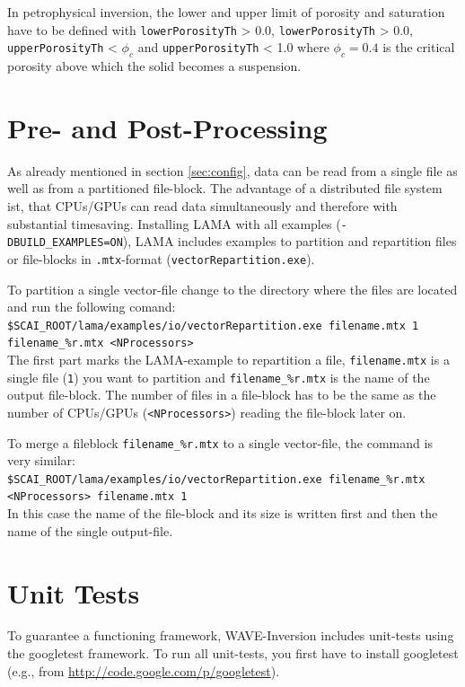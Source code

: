 \documentclass[pdftex,a4paper,parskip,listof=totoc,bibliography=totoc,onehalfspacing,12pt]{scrreprt}
\newcommand{\shellcmd}[1]{\indent\indent\texttt{#1}}	%
\newcommand{\shellcmdline}[1]{\indent\indent\texttt{\quad#1}} 	%
\begin{document}
In petrophysical inversion, the lower and upper limit of porosity and saturation have to be defined with \verb+lowerPorosityTh+ > 0.0, \verb+lowerPorosityTh+ > 0.0, \verb+upperPorosityTh+ < $\phi_c$ and \verb+upperPorosityTh+ < 1.0 where $\phi_c=0.4$ is the critical porosity above which the solid becomes a suspension. 

\clearpage
\section{Pre- and Post-Processing}\label{sec:process}

As already mentioned in section \ref{sec:config}, data can be read from a single file as well as from a partitioned file-block. The advantage of a distributed file system ist, that CPUs/GPUs can read data simultaneously and therefore with substantial timesaving. Installing LAMA with all examples (\shellcmd{-DBUILD\_EXAMPLES=ON}), LAMA includes examples to partition and repartition files or file-blocks in \shellcmd{.mtx}-format (\shellcmd{vectorRepartition.exe}). 

To partition a single vector-file change to the directory where the files are located and run the following comand:  \\
\shellcmdline{\$SCAI\_ROOT/lama/examples/io/vectorRepartition.exe filename.mtx 1 }\\
\shellcmdline{filename\_\%r.mtx <NProcessors>}\\
The first part marks the LAMA-example to repartition a file, \shellcmd{filename.mtx} is a single file (\shellcmd{1}) you want to partition and \shellcmd{filename\_\%r.mtx} is the name of the output file-block. The number of files in a file-block has to be the same as the number of CPUs/GPUs (\shellcmd{<NProcessors>}) reading the file-block later on. 

To merge a fileblock \shellcmd{filename\_\%r.mtx} to a single vector-file, the command is very similar:\\
\shellcmdline{\$SCAI\_ROOT/lama/examples/io/vectorRepartition.exe filename\_\%r.mtx}\\
\shellcmdline{<NProcessors> filename.mtx 1}\\
In this case the name of the file-block and its size is written first and then the name of the single output-file.

\section{Unit Tests}
To guarantee a functioning framework, WAVE-Inversion includes unit-tests using the googletest framework. To run all unit-tests, you first have to install googletest (e.g., from \url{http://code.google.com/p/googletest}). 
\end{document}
